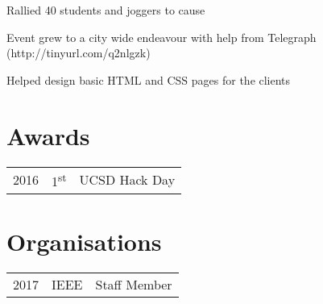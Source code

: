 \documentclass[]{deedy-resume-openfont}
\begin{document}
\begin{minipage}[t]{0.66\textwidth}
\sectionsep

\begin{tightemize}
\item Rallied 40 students and joggers to cause
\item Event grew to a city wide endeavour with help from Telegraph (http://tinyurl.com/q2nlgzk)
\end{tightemize}
\sectionsep

\vspace{\topsep} %
\begin{tightemize}
\item Helped design basic HTML and CSS pages for the clients
\end{tightemize}
\sectionsep


\section{Awards} 
\begin{tabular}{rll}
2016	     & 1\textsuperscript{st}  & UCSD Hack Day\\
\end{tabular}
\sectionsep


\section{Organisations}
\begin{tabular}{rll}
2017   & IEEE  & Staff Member\\
\end{tabular}
\sectionsep

\end{minipage} 
\end{document}
